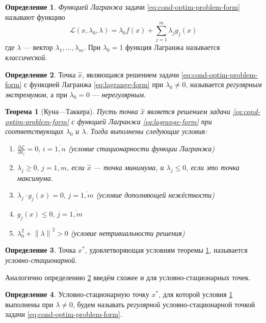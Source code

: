 \documentclass{article}
\renewcommand{\leq}{\leqslant}
\renewcommand{\geq}{\geqslant}
\providecommand{\La}{\mathcal{L}}
\providecommand{\neword}{\emph}
\providecommand{\pardiff}[2]{\frac{\partial{#1}}{\partial{#2}}}
\providecommand{\norm}[1]{\left \lVert{#1}\right \rVert}
\newtheorem{thm}{Теорема}[section]
\theoremstyle{remark}
\theoremstyle{definition}
\newtheorem{dfn}{Определение}[section]
\numberwithin{equation}{section}
\begin{document}
\begin{dfn} \neword{Функцией Лагранжа} задачи
  \eqref{eq:cond-optim-problem-form} называют функцию
  \begin{equation}
    \label{eq:lagrange-form}
    \La(x, \lambda_0, \lambda) = \lambda_0 f(x) + \sum_{j=1}^m {\lambda_j g_j(x)}
  \end{equation}
  где $\lambda$ — вектор $\lambda_1, \dotsc, \lambda_m$. При
  $\lambda_0=1$ функция Лагранжа называется \neword{классической}.
\end{dfn}

\begin{dfn}
  \label{dfn:regular}
  Точка $\hat{x}$, являющаяся решением задачи
  \eqref{eq:cond-optim-problem-form} с функцией Лагранжа
  \eqref{eq:lagrange-form} при $\lambda_0 \neq 0$, называется
  \neword{регулярным экстремумом}, а при $\lambda_0 = 0$ —
  \neword{нерегулярным}.
\end{dfn}

\begin{thm}[Куна—Таккера]
  \label{th:kuhn-tucker}
  Пусть точка $\hat{x}$ является решением задачи
  \eqref{eq:cond-optim-problem-form} с функцией Лагранжа
  \eqref{eq:lagrange-form} при соответствующих $\lambda_0$ и
  $\lambda$. Тогда выполнены следующие условия:
  \begin{enumerate}
    \renewcommand{\labelenumi}{\emph{\asbuk{enumi})}}
  \item $\pardiff{\La}{x_i}=0,\, i=\overline{1,n}$ (условие
    стационарности функции Лагранжа)
  \item $\lambda_j \geq 0,\, j=\overline{1,m}$, если $\hat{x}$ — точка
    минимума, и $\lambda_j \leq 0$, если это точка максимума.
  \item $\lambda_j \cdot g_j(x) = 0,\, j=\overline{1,m}$ (условие
    дополняющей нежёсткости)
  \item $g_j(x) \leq 0,\, j=\overline{1,m}$
  \item $\lambda_0^2 + \norm{\lambda}^2 > 0$ (условие нетривиальности решения)
  \end{enumerate}
\end{thm}

\begin{dfn}
  Точка $x^*$, удовлетворяющая условиям теоремы \ref{th:kuhn-tucker},
  называется \neword{условно-стационарной}.
\end{dfn}

Аналогично определению \ref{dfn:regular} введём схожее и для
условно-стационарных точек.
\begin{dfn}
  Условно-стационарную точку $x^*$, для которой условия
  \ref{th:kuhn-tucker} выполнены при $\lambda ≠ 0$, будем называть
  \neword{регулярной} условно-стационарной точкой задачи
  \eqref{eq:cond-optim-problem-form}.
\end{dfn}
\end{document}
